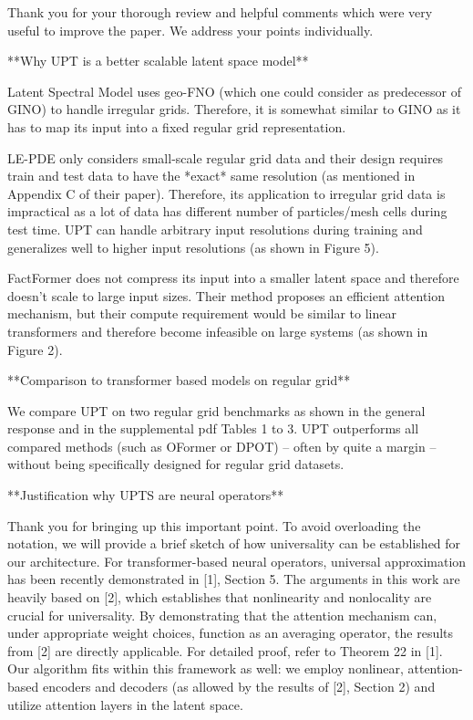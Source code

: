Thank you for your thorough review and helpful comments which were very useful to improve the paper. We address your points individually.


**Why UPT is a better scalable latent space model**

Latent Spectral Model uses geo-FNO (which one could consider as predecessor of GINO) to handle irregular grids. Therefore, it is somewhat similar to GINO as it has to map its input into a fixed regular grid representation.

LE-PDE only considers small-scale regular grid data and their design requires train and test data to have the *exact* same resolution (as mentioned in Appendix C of their paper). Therefore, its application to irregular grid data is impractical as a lot of data has different number of particles/mesh cells during test time. UPT can handle arbitrary input resolutions during training and generalizes well to higher input resolutions (as shown in Figure 5).

FactFormer does not compress its input into a smaller latent space and therefore doesn't scale to large input sizes. Their method proposes an efficient attention mechanism, but their compute requirement would be similar to linear transformers and therefore become infeasible on large systems (as shown in Figure 2).

**Comparison to transformer based models on regular grid**

We compare UPT on two regular grid benchmarks as shown in the general response and in the supplemental pdf Tables 1 to 3. UPT outperforms all compared methods (such as OFormer or DPOT) -- often by quite a margin -- without being specifically designed for regular grid datasets.



**Justification why UPTS are neural operators**

Thank you for bringing up this important point. To avoid overloading the notation, we will provide a brief sketch of how universality can be established for our architecture. For transformer-based neural operators, universal approximation has been recently demonstrated in [1], Section 5. The arguments in this work are heavily based on [2], which establishes that nonlinearity and nonlocality are crucial for universality. By demonstrating that the attention mechanism can, under appropriate weight choices, function as an averaging operator, the results from [2] are directly applicable. For detailed proof, refer to Theorem 22 in [1].
Our algorithm fits within this framework as well: we employ nonlinear, attention-based encoders and decoders (as allowed by the results of [2], Section 2) and utilize attention layers in the latent space.

